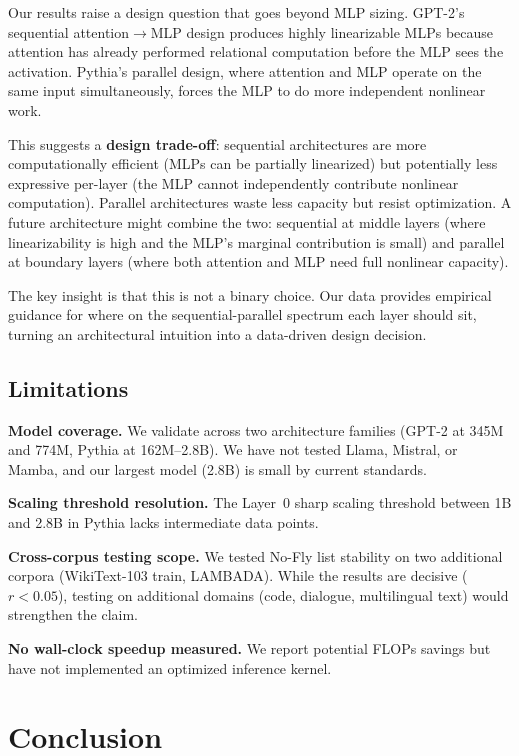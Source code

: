 \documentclass[11pt]{article}
\begin{document}
Our results raise a design question that goes beyond MLP sizing. GPT-2's sequential attention$\to$MLP design produces highly linearizable MLPs because attention has already performed relational computation before the MLP sees the activation. Pythia's parallel design, where attention and MLP operate on the same input simultaneously, forces the MLP to do more independent nonlinear work.

This suggests a \textbf{design trade-off}: sequential architectures are more computationally efficient (MLPs can be partially linearized) but potentially less expressive per-layer (the MLP cannot independently contribute nonlinear computation). Parallel architectures waste less capacity but resist optimization. A future architecture might combine the two: sequential at middle layers (where linearizability is high and the MLP's marginal contribution is small) and parallel at boundary layers (where both attention and MLP need full nonlinear capacity).

The key insight is that this is not a binary choice. Our data provides empirical guidance for where on the sequential-parallel spectrum each layer should sit, turning an architectural intuition into a data-driven design decision.

\subsection{Limitations}

\textbf{Model coverage.} We validate across two architecture families (GPT-2 at 345M and 774M, Pythia at 162M--2.8B). We have not tested Llama, Mistral, or Mamba, and our largest model (2.8B) is small by current standards.

\textbf{Scaling threshold resolution.} The Layer~0 sharp scaling threshold between 1B and 2.8B in Pythia lacks intermediate data points.

\textbf{Cross-corpus testing scope.} We tested No-Fly list stability on two additional corpora (WikiText-103 train, LAMBADA). While the results are decisive ($r < 0.05$), testing on additional domains (code, dialogue, multilingual text) would strengthen the claim.

\textbf{No wall-clock speedup measured.} We report potential FLOPs savings but have not implemented an optimized inference kernel.

\section{Conclusion}
\end{document}
